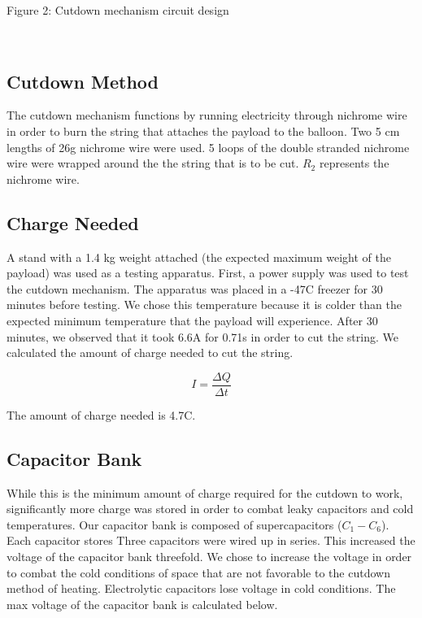 \documentclass[12pt,]{article}
\begin{document}
Figure 2: Cutdown mechanism circuit design

~

\subsection{Cutdown Method}\label{cutdown-method}

The cutdown mechanism functions by running electricity through nichrome
wire in order to burn the string that attaches the payload to the
balloon. Two 5 cm lengths of 26g nichrome wire were used. 5 loops of the
double stranded nichrome wire were wrapped around the the string that is
to be cut. \(R_{2}\) represents the nichrome wire.

\subsection{Charge Needed}\label{charge-needed}

A stand with a 1.4 kg weight attached (the expected maximum weight of
the payload) was used as a testing apparatus. First, a power supply was
used to test the cutdown mechanism. The apparatus was placed in a
-47\degree C freezer for 30 minutes before testing. We chose this
temperature because it is colder than the expected minimum temperature
that the payload will experience. After 30 minutes, we observed that it
took 6.6A for 0.71s in order to cut the string. We calculated the amount
of charge needed to cut the string.

\[I=\frac{\Delta Q}{\Delta t}\]

The amount of charge needed is 4.7C.

\subsection{Capacitor Bank}\label{capacitor-bank}

While this is the minimum amount of charge required for the cutdown to
work, significantly more charge was stored in order to combat leaky
capacitors and cold temperatures. Our capacitor bank is composed of
supercapacitors (\(C_{1}-C_{6}\)). Each capacitor stores Three
capacitors were wired up in series. This increased the voltage of the
capacitor bank threefold. We chose to increase the voltage in order to
combat the cold conditions of space that are not favorable to the
cutdown method of heating. Electrolytic capacitors lose voltage in cold
conditions. The max voltage of the capacitor bank is calculated below.
\end{document}
